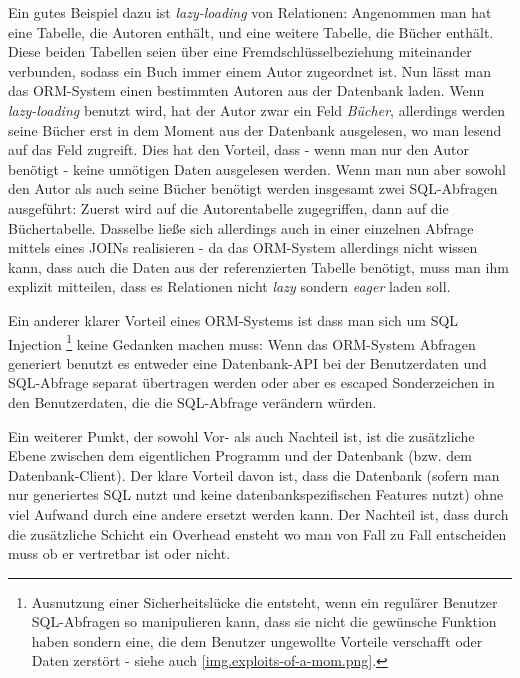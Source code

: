 Ein gutes Beispiel dazu ist \emph{lazy-loading} von Relationen: Angenommen man
hat eine Tabelle, die Autoren enthält, und eine weitere Tabelle, die Bücher
enthält. Diese beiden Tabellen seien über eine Fremdschlüsselbeziehung
miteinander verbunden, sodass ein Buch immer einem Autor zugeordnet ist.
Nun lässt man das ORM-System einen bestimmten Autoren aus der Datenbank
laden. Wenn \emph{lazy-loading} benutzt wird, hat der Autor zwar ein Feld
\emph{Bücher}, allerdings werden seine Bücher erst in dem Moment aus der
Datenbank ausgelesen, wo man lesend auf das Feld zugreift. Dies hat den Vorteil,
dass - wenn man nur den Autor benötigt - keine unnötigen Daten ausgelesen
werden. Wenn man nun aber sowohl den Autor als auch seine Bücher benötigt werden
insgesamt zwei SQL-Abfragen ausgeführt: Zuerst wird auf die Autorentabelle
zugegriffen, dann auf die Büchertabelle. Dasselbe ließe sich allerdings auch in
einer einzelnen Abfrage mittels eines JOINs realisieren - da das ORM-System
allerdings nicht wissen kann, dass auch die Daten aus der referenzierten Tabelle
benötigt, muss man ihm explizit mitteilen, dass es Relationen nicht \emph{lazy}
sondern \emph{eager} laden soll.

Ein anderer klarer Vorteil eines ORM-Systems ist dass man sich um SQL Injection
\footnote{Ausnutzung einer Sicherheitslücke die entsteht, wenn ein regulärer
Benutzer SQL-Abfragen so manipulieren kann, dass sie nicht die gewünsche
Funktion haben sondern eine, die dem Benutzer ungewollte Vorteile verschafft
oder Daten zerstört - siehe auch \autoref{img.exploits-of-a-mom.png}.} keine
Gedanken machen muss: Wenn das ORM-System Abfragen
generiert benutzt es entweder eine Datenbank-API bei der Benutzerdaten und
SQL-Abfrage separat übertragen werden oder aber es escaped Sonderzeichen in den
Benutzerdaten, die die SQL-Abfrage verändern würden.


Ein weiterer Punkt, der sowohl Vor- als auch Nachteil ist, ist die zusätzliche
Ebene zwischen dem eigentlichen Programm und der Datenbank (bzw. dem
Datenbank-Client). Der klare Vorteil davon ist, dass die Datenbank (sofern man
nur generiertes SQL nutzt und keine datenbankspezifischen Features nutzt) ohne
viel Aufwand durch eine andere ersetzt werden kann. Der Nachteil ist, dass durch
die zusätzliche Schicht ein Overhead ensteht wo man von Fall zu Fall entscheiden
muss ob er vertretbar ist oder nicht.



